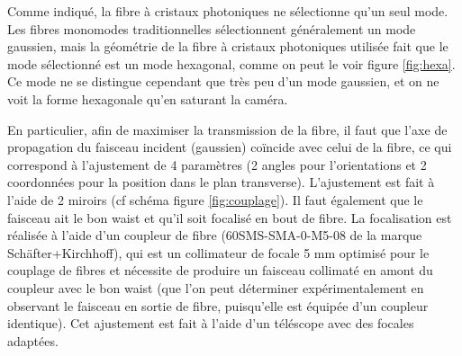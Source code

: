 \documentclass[11pt,a4paper] { article}
\begin{document}
Comme indiqué, la fibre à cristaux photoniques ne sélectionne qu'un seul mode. Les fibres monomodes traditionnelles sélectionnent généralement un mode gaussien, mais la géométrie de la fibre à cristaux photoniques utilisée fait que le mode sélectionné est un mode hexagonal, comme on peut le voir figure \ref{fig:hexa}. Ce mode ne se distingue cependant que très peu d'un mode gaussien, et on ne voit la forme hexagonale qu'en saturant la caméra.

En particulier, afin de maximiser la transmission de la fibre, il faut que l'axe de propagation du faisceau incident (gaussien) coïncide avec celui de la fibre, ce qui correspond à l'ajustement de 4 paramètres (2 angles pour l'orientations et 2 coordonnées pour la position dans le plan transverse). L'ajustement est fait à l'aide de 2 miroirs (cf schéma figure \ref{fig:couplage}). Il faut également que le faisceau ait le bon waist et qu'il soit focalisé en bout de fibre. La focalisation est réalisée à l'aide d'un coupleur de fibre (60SMS-SMA-0-M5-08 de la marque Schäfter+Kirchhoff), qui est un collimateur de focale 5 mm optimisé pour le couplage de fibres et nécessite de produire un faisceau collimaté en amont du coupleur avec le bon waist (que l'on peut déterminer expérimentalement en observant le faisceau en sortie de fibre, puisqu'elle est équipée d'un coupleur identique). Cet ajustement est fait à l'aide d'un téléscope avec des focales adaptées.
\end{document}
